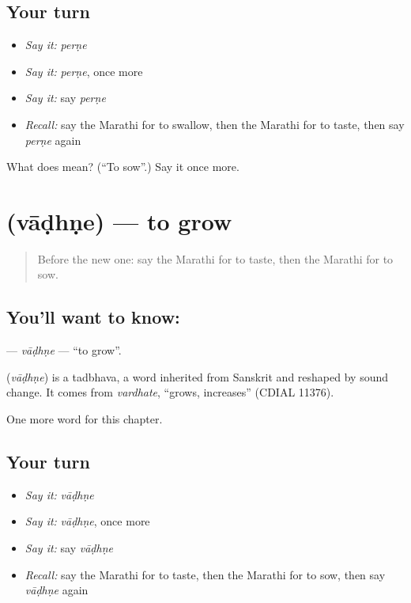 \subsection*{Your turn}
\begin{itemize}
\raggedright
  \item \emph{Say it:} \emph{perṇe}
  \item \emph{Say it:} \emph{perṇe}, once more
  \item \emph{Say it:} say \emph{perṇe}
  \item \emph{Recall:} say the Marathi for to swallow, then the Marathi for to taste, then say \emph{perṇe} again
\end{itemize}

\begin{tcolorbox}[breakable,colback=teal!4,colframe=teal!35!black,title={Before you move on}]
What does  mean? (\textquotedblleft{}To sow\textquotedblright{}.) Say it once more.
\end{tcolorbox}
\section[\texorpdfstring{\mr{वाढणे} (vāḍhṇe)}{वाढणे (vāḍhṇe)}]{ (vāḍhṇe) — to grow}

\label{lesson:MR-C157-vadhne}



\begin{quote}
Before the new one: say the Marathi for to taste, then the Marathi for to sow.
\end{quote}

\subsection*{You'll want to know: }
\textbf{} — \emph{vāḍhṇe} — \textquotedblleft{}to grow\textquotedblright{}.

\begin{cousinweb}
\textbf{} (\emph{vāḍhṇe}) is a tadbhava, a word inherited from Sanskrit and reshaped by sound change. It comes from \emph{vardhate}, \textquotedblleft{}grows, increases\textquotedblright{} (CDIAL 11376).
\end{cousinweb}

\begin{grammarlens}[title={What you've built}]
One more word for this chapter.
\end{grammarlens}

\subsection*{Your turn}
\begin{itemize}
\raggedright
  \item \emph{Say it:} \emph{vāḍhṇe}
  \item \emph{Say it:} \emph{vāḍhṇe}, once more
  \item \emph{Say it:} say \emph{vāḍhṇe}
  \item \emph{Recall:} say the Marathi for to taste, then the Marathi for to sow, then say \emph{vāḍhṇe} again
\end{itemize}

